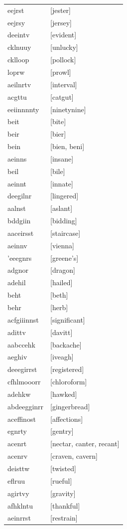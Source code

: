 \documentclass{article}
\begin{document}
\begin{tabular}{ll}
eejrst & [jester] \\
eejrsy & [jersey] \\
deeintv & [evident] \\
cklnuuy & [unlucky] \\
cklloop & [pollock] \\
loprw & [prowl] \\
aeilnrtv & [interval] \\
acgttu & [catgut] \\
eeiinnnnty & [ninetynine] \\
beit & [bite] \\
beir & [bier] \\
bein & [bien, beni] \\
aeinns & [insane] \\
beil & [bile] \\
aeinnt & [innate] \\
deegilnr & [lingered] \\
aalnst & [aslant] \\
bddgiin & [bidding] \\
aaceirsst & [staircase] \\
aeinnv & [vienna] \\
'eeegnrs & [greene's] \\
adgnor & [dragon] \\
adehil & [hailed] \\
beht & [beth] \\
behr & [herb] \\
acfgiiinnst & [significant] \\
adittv & [davitt] \\
aabccehk & [backache] \\
aeghiv & [iveagh] \\
deeegirrst & [registered] \\
cfhlmooorr & [chloroform] \\
adehkw & [hawked] \\
abdeegginrr & [gingerbread] \\
aceffinost & [affections] \\
egnrty & [gentry] \\
acenrt & [nectar, canter, recant] \\
acenrv & [craven, cavern] \\
deisttw & [twisted] \\
eflruu & [rueful] \\
agirtvy & [gravity] \\
afhklntu & [thankful] \\
aeinrrst & [restrain] \\

\end{tabular}
\end{document}
